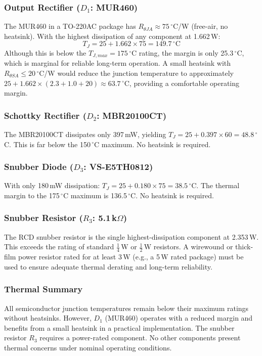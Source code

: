 \subsubsection*{Output Rectifier ($D_1$: MUR460)}
The MUR460 in a TO-220AC package has $R_{\theta JA} \approx 75\,^\circ$C/W (free-air, no heatsink). With the highest dissipation of any component at 1.662\,W:
\begin{equation}
T_J = 25 + 1.662 \times 75 = 149.7\,^\circ\text{C}
\end{equation}
Although this is below the $T_{J,max} = 175\,^\circ$C rating, the margin is only 25.3$\,^\circ$C, which is marginal for reliable long-term operation. A small heatsink with $R_{\theta SA} \leq 20\,^\circ$C/W would reduce the junction temperature to approximately $25 + 1.662 \times (2.3 + 1.0 + 20) \approx 63.7\,^\circ$C, providing a comfortable operating margin.

\subsubsection*{Schottky Rectifier ($D_2$: MBR20100CT)}
The MBR20100CT dissipates only 397\,mW, yielding $T_J = 25 + 0.397 \times 60 = 48.8\,^\circ$C. This is far below the 150$\,^\circ$C maximum. No heatsink is required.

\subsubsection*{Snubber Diode ($D_3$: VS-E5TH0812)}
With only 180\,mW dissipation: $T_J = 25 + 0.180 \times 75 = 38.5\,^\circ$C. The thermal margin to the 175$\,^\circ$C maximum is 136.5$\,^\circ$C. No heatsink is required.

\subsubsection*{Snubber Resistor ($R_3$: 5.1\,k$\Omega$)}
The RCD snubber resistor is the single highest-dissipation component at 2.353\,W. This exceeds the rating of standard $\frac{1}{4}$\,W or $\frac{1}{2}$\,W resistors. A wirewound or thick-film power resistor rated for at least 3\,W (e.g., a 5\,W rated package) must be used to ensure adequate thermal derating and long-term reliability.

\subsubsection*{Thermal Summary}
All semiconductor junction temperatures remain below their maximum ratings without heatsinks. However, $D_1$ (MUR460) operates with a reduced margin and benefits from a small heatsink in a practical implementation. The snubber resistor $R_3$ requires a power-rated component. No other components present thermal concerns under nominal operating conditions.

